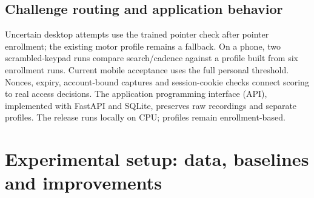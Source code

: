 \documentclass[10pt,a4paper]{article}
\begin{document}
\subsection{Challenge routing and application behavior}
Uncertain desktop attempts use the trained pointer check after pointer enrollment; the existing motor profile remains a fallback. On a phone, two scrambled-keypad runs compare search/cadence against a profile built from six enrollment runs. Current mobile acceptance uses the full personal threshold. Nonces, expiry, account-bound captures and session-cookie checks connect scoring to real access decisions. The application programming interface (API), implemented with FastAPI and SQLite, preserves raw recordings and separate profiles. The release runs locally on CPU; profiles remain enrollment-based.

\newpage
\section{Experimental setup: data, baselines and improvements}
\end{document}
